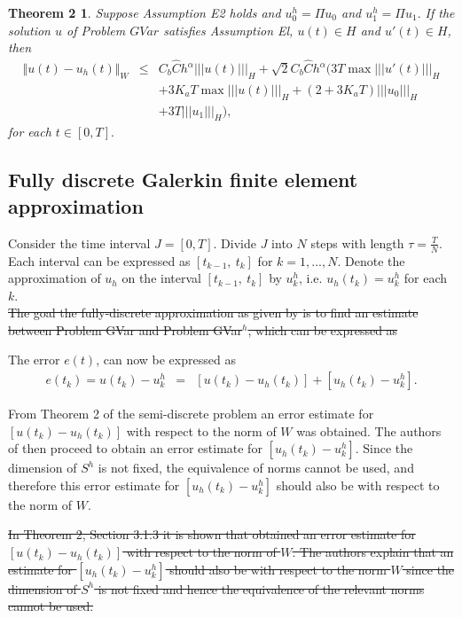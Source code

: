 \documentclass[../../main.tex]{subfiles}
\begin{document}
\newtheorem*{DC_Thm4}{Theorem 2}
\begin{DC_Thm4}
	Suppose Assumption E2 holds and $u_{0}^{h}=\Pi u_{0}$ and $u_{1}^{h}=\Pi u_{1}.$ If the solution $u$ of Problem $GVar$ satisfies Assumption El, $u(t)\in H$ and $u'(t)\in H$, then
	\begin{eqnarray*}
		\Vert u(t)-u_{h}(t)\Vert_{W} & \leq & C_{b} \hat{C}h^{\alpha}|||u(t)|||_{H}+\sqrt{2}C_{b}\hat{C}h^{\alpha}(3T\max|||u'(t)|||_{H}\\
		& & +3K_{a}T\max|||u(t)|||_{H}+(2+3K_{a}T)|||u_{0}|||_{H} \\
		& & +3T|||u_{1}|||_{H}) ,
	\end{eqnarray*} for each $t\in[0, T].$
\end{DC_Thm4}


\subsection{Fully discrete Galerkin finite element approximation}
Consider the time interval $J = [0,T]$. Divide $J$ into $N$ steps with length $\tau = \frac{T}{N}$. Each interval can be expressed as $[t_{k-1}, \ t_k]$ for $k = 1,...,N$. Denote the approximation of $u_h$ on the interval $[t_{k-1}, \ t_k]$ by $u_k^h$, i.e. $u_h(t_k) = u_k^h$ for each $k$.\\


\sout{The goal the fully-discrete approximation as given by \cite{BV13} is to find an estimate between Problem GVar and Problem GVar$^h$, which can be expressed as}

The error $e(t)$, can now be expressed as
\begin{eqnarray}
	e(t_k) = u(t_k) - u^h_k & = & [u(t_k)-u_h(t_k)] + [u_h(t_k) - u^h_k]. \label{error_e}
\end{eqnarray}


From Theorem 2 of the semi-discrete problem an error estimate for $[u(t_k)-u_h(t_k)]$ with respect to the norm of $W$ was obtained. The authors of \cite{BV13} then proceed to obtain an error estimate for $[u_h(t_k) - u^h_k]$. Since the dimension of $S^h$ is not fixed, the equivalence of norms cannot be used, and therefore this error estimate for $[u_h(t_k) - u^h_k]$ should also be with respect to the norm of $W$.

\sout{In Theorem 2, Section 3.1.3 it is shown that \cite{BV13} obtained an error estimate for $[u(t_k)-u_h(t_k)]$ with respect to the norm of $W$. The authors explain that an estimate for $[u_h(t_k) - u^h_k]$ should also be with respect to the norm $W$ since the dimension of $S^h$ is not fixed and hence the equivalence of the relevant norms cannot be used.}\\
\end{document}
